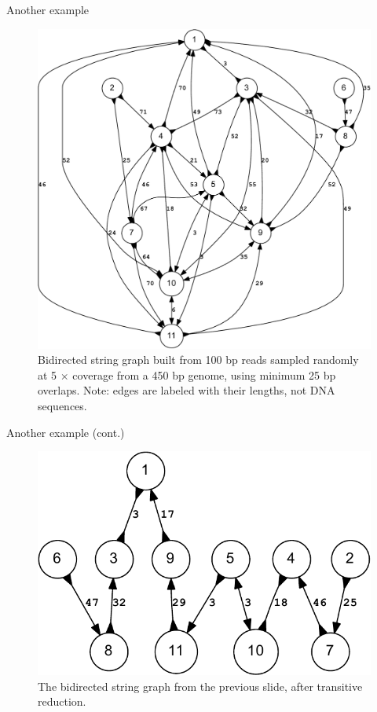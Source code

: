 \documentclass[xcolor=dvipsnames]{beamer}
\begin{document}
\begin{frame}{Another example}
	\begin{figure}[H]
		\includegraphics[scale=0.25]{example.bidigraph-crop.pdf}	
		\caption{Bidirected string graph built from 100 bp reads sampled
		randomly at 5 $\times$ coverage from a 450 bp genome, using minimum 25
		bp overlaps.  Note: edges are labeled with their lengths, not DNA
		sequences.}
	\end{figure}
\end{frame}

\begin{frame}{Another example (cont.)}
	\begin{figure}[H]
		\includegraphics[scale=0.7]{example.reduced.mapped.bidigraph-crop.pdf}	
		\caption{The bidirected string graph from the previous slide, after
		transitive reduction.}
	\end{figure}
\end{frame}
\end{document}

